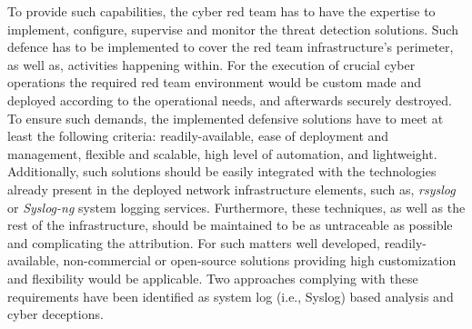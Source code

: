 To provide such capabilities, the cyber red team has to have the expertise to implement, configure, supervise and monitor the threat detection solutions.
Such defence has to be implemented to cover the red team infrastructure's perimeter, as well as, activities happening within.
For the execution of crucial cyber operations the required red team environment would be custom made and deployed according to the operational needs, and afterwards securely destroyed.
To ensure such demands, the implemented defensive solutions have to meet at least the following criteria: readily-available, ease of deployment and management, flexible and scalable, high level of automation, and lightweight. Additionally, such solutions should be easily integrated with the technologies already present in the deployed network infrastructure elements, such as, \textit{rsyslog} or \textit{Syslog-ng} system logging services. Furthermore, these techniques, as well as the rest of the infrastructure, should be maintained to be as untraceable as possible and complicating the attribution. For such matters well developed, readily-available, non-commercial or open-source solutions providing high customization and flexibility would be applicable.
Two approaches complying with these requirements have been identified as system log (i.e., Syslog) based analysis and cyber deceptions.

